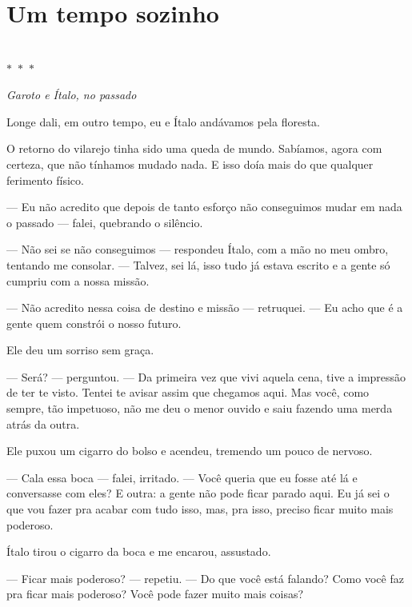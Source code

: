 \newpage

\ifdefined\useChapters
\chapter{Um tempo sozinho}
\else
\chapter{}
\fi

\begin{center}
  $\ast$~$\ast$~$\ast$

  \textit{Garoto e Ítalo, no passado}
\end{center}

Longe dali, em outro tempo, eu e Ítalo andávamos pela floresta.

O retorno do vilarejo tinha sido uma queda de mundo.  
Sabíamos, agora com certeza, que não tínhamos mudado nada.  
E isso doía mais do que qualquer ferimento físico.

— Eu não acredito que depois de tanto esforço não conseguimos mudar em nada o passado — falei, quebrando o silêncio.

— Não sei se não conseguimos — respondeu Ítalo, com a mão no meu ombro, tentando me consolar. — Talvez, sei lá, isso tudo já estava escrito e a gente só cumpriu com a nossa missão.

— Não acredito nessa coisa de destino e missão — retruquei. — Eu acho que é a gente quem constrói o nosso futuro.

Ele deu um sorriso sem graça.

— Será? — perguntou. — Da primeira vez que vivi aquela cena, tive a impressão de ter te visto.  
Tentei te avisar assim que chegamos aqui.  
Mas você, como sempre, tão impetuoso, não me deu o menor ouvido e saiu fazendo uma merda atrás da outra.

Ele puxou um cigarro do bolso e acendeu, tremendo um pouco de nervoso.

— Cala essa boca — falei, irritado. — Você queria que eu fosse até lá e conversasse com eles?  
E outra: a gente não pode ficar parado aqui.  
Eu já sei o que vou fazer pra acabar com tudo isso, mas, pra isso, preciso ficar muito mais poderoso.

Ítalo tirou o cigarro da boca e me encarou, assustado.

— Ficar mais poderoso? — repetiu. — Do que você está falando?  
Como você faz pra ficar mais poderoso?  
Você pode fazer muito mais coisas?

